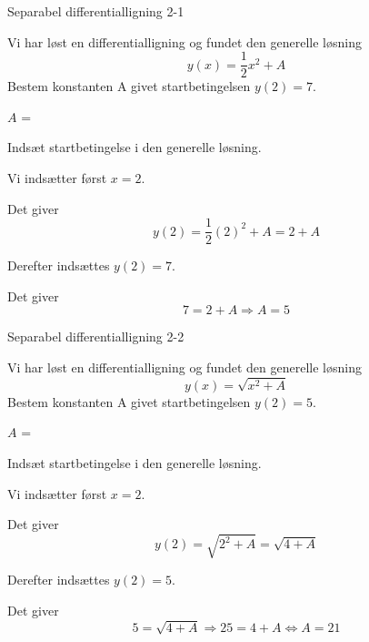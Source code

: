 \documentclass{article}
\begin{document}
\tableofcontents

\newpage

\begin{exercise}{Separabel differentialligning 2-1}


Vi har løst en differentialligning og fundet den generelle løsning
\[
y(x) = \frac{1}{2}x^2 + A
\]
Bestem konstanten A givet startbetingelsen $y(2)=7$.

$A$ = 

\hint

Indsæt startbetingelse i den generelle løsning.


\hint

Vi indsætter først $x=2$.

\hint

Det giver
\[
y(2)= \frac{1}{2}(2)^2 + A = 2 + A
\]

\hint

Derefter indsættes $y(2)=7$.

\hint

Det giver
\[
7 = 2 + A \Rightarrow A = 5
\]

\end{exercise}

\newpage

\begin{exercise}{Separabel differentialligning 2-2}


Vi har løst en differentialligning og fundet den generelle løsning
\[
y(x) = \sqrt{x^2 + A}
\]
Bestem konstanten A givet startbetingelsen $y(2)=5$.

$A$ = 

\hint

Indsæt startbetingelse i den generelle løsning.


\hint

Vi indsætter først $x=2$.

\hint

Det giver
\[
y(2)= \sqrt{2^2 + A} = \sqrt{4 + A}
\]

\hint

Derefter indsættes $y(2)=5$.

\hint

Det giver
\[
5 = \sqrt{4 + A} \Rightarrow 25 = 4 + A \Leftrightarrow A = 21
\]

\end{exercise}

\newpage
\end{document}
